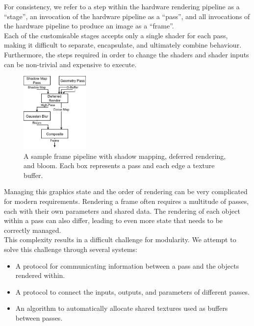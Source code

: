 \documentclass[format=sigconf]{acmart}
\begin{document}
For consistency, we refer to a step within the hardware rendering pipeline as a ``stage'', an invocation of the hardware pipeline as a ``pass'', and all invocations of the hardware pipeline to produce an image as a ``frame''. \\

Each of the customisable stages accepts only a single shader for each pass, making it difficult to separate, encapsulate, and ultimately combine behaviour. Furthermore, the steps required in order to change the shaders and shader inputs can be non-trivial and expensive to execute. \\

\begin{figure}[h]
  \begin{center}
    \includegraphics[width=0.3\textwidth]{render-pipeline.png}
  \end{center}
  \caption{A sample frame pipeline with shadow mapping, deferred rendering, and bloom. Each box represents a pass and each edge a texture buffer.}
  \label{fig:render-pipeline}
\end{figure}

Managing this graphics state and the order of rendering can be very complicated for modern requirements. Rendering a frame often requires a multitude of passes, each with their own parameters and shared data. The rendering of each object within a pass can also differ, leading to even more state that needs to be correctly managed. \\

This complexity results in a difficult challenge for modularity. We attempt to solve this challenge through several systems:

\begin{itemize}
\item A protocol for communicating information between a pass and the objects rendered within.
\item A protocol to connect the inputs, outputs, and parameters of different passes.
\item An algorithm to automatically allocate shared textures used as buffers between passes.
\end{itemize}
\end{document}
